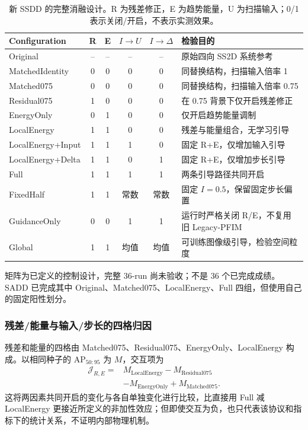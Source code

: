 \begin{table}[tp]
\centering\small
\setlength{\tabcolsep}{4pt}
\caption{新 SSDD 的完整消融设计。R 为残差修正，E 为趋势能量，U 为扫描输入；0/1 表示关闭/开启，不表示实测效果。}\label{tab:control_matrix}
\begin{tabularx}{\linewidth}{@{}lccccX@{}}
\toprule
Configuration & R & E & $I\to U$ & $I\to\Delta$ & 检验目的\\
\midrule
Original & -- & -- & -- & -- & 原始四向 SS2D 系统参考\\
MatchedIdentity & 0 & 0 & 0 & 0 & 同替换结构，扫描输入倍率 1\\
Matched075 & 0 & 0 & 0 & 0 & 同替换结构，扫描输入倍率 0.75\\
Residual075 & 1 & 0 & 0 & 0 & 在 0.75 背景下仅开启残差修正\\
EnergyOnly & 0 & 1 & 0 & 0 & 仅开启趋势能量调制\\
LocalEnergy & 1 & 1 & 0 & 0 & 残差与能量组合，无学习引导\\
LocalEnergy+Input & 1 & 1 & 1 & 0 & 固定 R+E，仅增加输入引导\\
LocalEnergy+Delta & 1 & 1 & 0 & 1 & 固定 R+E，仅增加步长引导\\
Full & 1 & 1 & 1 & 1 & 两条引导路径共同开启\\
FixedHalf & 1 & 1 & 常数 & 常数 & 固定 $I=0.5$，保留固定步长偏置\\
GuidanceOnly & 0 & 0 & 1 & 1 & 运行时严格关闭 R/E，不复用旧 Legacy-PFIM\\
Global & 1 & 1 & 均值 & 均值 & 可训练图像级引导，检验空间粒度\\
\bottomrule
\end{tabularx}
\smallskip
\begin{minipage}{\linewidth}\footnotesize
矩阵为已定义的控制设计，完整 36-run 尚未验收；不是 36 个已完成成绩。SADD 已完成其中 Original、Matched075、LocalEnergy、Full 四组，但使用自己的固定阳性划分。
\end{minipage}
\end{table}

\subsubsection{残差/能量与输入/步长的四格归因}
残差和能量的四格由 Matched075、Residual075、EnergyOnly、LocalEnergy 构成。以相同种子的 AP$_{50:95}$ 为 $M$，交互项为
\begin{equation}
\begin{aligned}
\mathcal{J}_{R,E}={}&M_{\mathrm{LocalEnergy}}-M_{\mathrm{Residual075}}\\
&-M_{\mathrm{EnergyOnly}}+M_{\mathrm{Matched075}}.
\end{aligned}
\label{eq:interaction_re}
\end{equation}
这将两因素共同开启的变化与各自单独变化进行比较，比直接用 Full 减 LocalEnergy 更接近所定义的非加性效应；但即使交互为负，也只代表该协议和指标下的统计关系，不证明内部物理机制。

